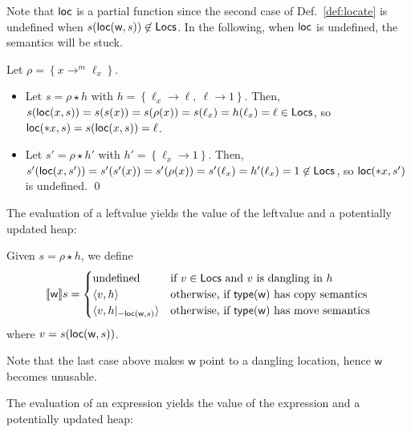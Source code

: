 \noindent
Note that $\loc$ is a partial function since the second case of
Def.~\ref{def:locate} is undefined when
$s(\loc(\mathsf{w},s))\not\in\Locs$. In the following, when $\loc$ is undefined, the
semantics will be stuck.

\begin{example}
  Let $\rho = \left\{x\rightarrow^m\ell_x\right\}$.
  \begin{itemize}
    \item Let $s = \rho\star h$ with
    $h = \left\{\ell_x\rightarrow\ell,\ \ell\rightarrow 1\right\}$.
    Then, $s(\loc(x,s)) = s(s(x)) = s(\rho(x)) = s(\ell_x) =
    h(\ell_x) = \ell\in\Locs$, so
    $\loc(\mathtt{*}x,s)= s(\loc(x,s)) = \ell$.
    \item Let $s' = \rho\star h'$ with
    $h' = \left\{\ell_x\rightarrow 1\right\}$. Then,
    $s'(\loc(x,s')) = s'(s'(x)) = s'(\rho(x)) = s'(\ell_x) =
    h'(\ell_x) = 1 \not\in\Locs$, so $\loc(\mathtt{*}x,s')$ is undefined.
    \qed
  \end{itemize}
\end{example}

The evaluation of a leftvalue yields the value of the leftvalue and a potentially updated heap:

\begin{definition}\label{def:semantics_leftvalues}
  Given $s=\rho\star h$, we define
  \[
  \den[\mathsf{w}]{s}=\begin{cases}
  \text{undefined} & \text{if $v\in\Locs$ and $v$ is dangling in $h$}\\
  \langle v, h\rangle & \text{otherwise, if $\type(\mathsf{w})$ has copy semantics}\\
  \langle v, h|_{-\loc(\mathsf{w},s)}\rangle & \text{otherwise, if $\type(\mathsf{w})$ has move semantics}
  \end{cases}
  \]
  where $v=s(\loc(\mathsf{w},s))$.
\end{definition}

\noindent
Note that the last case above makes $\mathsf{w}$ point to a dangling location, hence
$\mathsf{w}$ becomes unusable.

The evaluation of an expression yields the value of the expression and a potentially updated heap:


